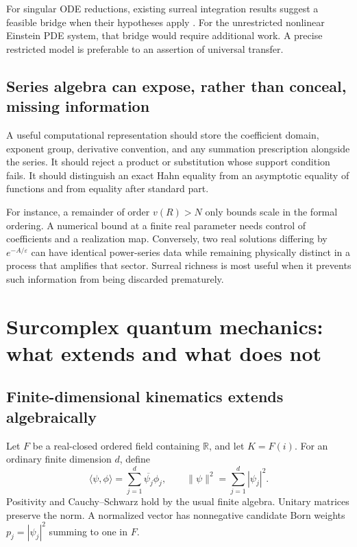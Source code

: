 \documentclass[11pt,a4paper]{article}
\numberwithin{equation}{section}
\theoremstyle{definition}
\theoremstyle{remark}
\newcommand{\R}{\mathbb R}
\newcommand{\eps}{\varepsilon}
\begin{document}
For singular ODE reductions, existing surreal integration results suggest a feasible bridge when their hypotheses apply \cite{CE}. For the unrestricted nonlinear Einstein PDE system, that bridge would require additional work. A precise restricted model is preferable to an assertion of universal transfer.

\subsection{Series algebra can expose, rather than conceal, missing information}
A useful computational representation should store the coefficient domain, exponent group, derivative convention, and any summation prescription alongside the series. It should reject a product or substitution whose support condition fails. It should distinguish an exact Hahn equality from an asymptotic equality of functions and from equality after standard part.

For instance, a remainder of order $v(R)>N$ only bounds scale in the formal ordering. A numerical bound at a finite real parameter needs control of coefficients and a realization map. Conversely, two real solutions differing by $e^{-A/\eps}$ can have identical power-series data while remaining physically distinct in a process that amplifies that sector. Surreal richness is most useful when it prevents such information from being discarded prematurely.

\section{Surcomplex quantum mechanics: what extends and what does not}
\label{sec:quantum}

\subsection{Finite-dimensional kinematics extends algebraically}
Let $F$ be a real-closed ordered field containing $\R$, and let $K=F(i)$. For an ordinary finite dimension $d$, define
\begin{equation}
 \langle\psi,\phi\rangle=\sum_{j=1}^d\overline{\psi_j}\phi_j,
 \qquad \|\psi\|^2=\sum_{j=1}^d|\psi_j|^2.
\end{equation}
Positivity and Cauchy--Schwarz hold by the usual finite algebra. Unitary matrices preserve the norm. A normalized vector has nonnegative candidate Born weights $p_j=|\psi_j|^2$ summing to one in $F$.
\end{document}
